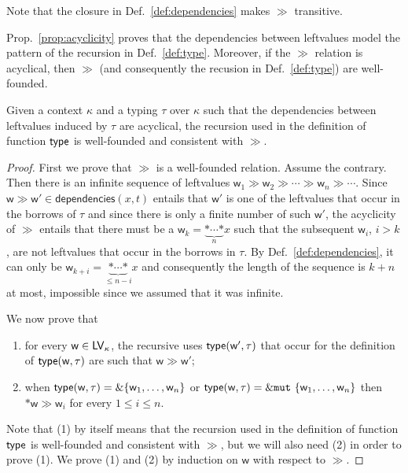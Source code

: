 \noindent
Note that the closure in Def.~\ref{def:dependencies} makes $\gg$ transitive.

Prop.~\ref{prop:acyclicity} proves that the dependencies between leftvalues
model the pattern of the recursion in Def.~\ref{def:type}. Moreover,
if the $\gg$ relation is acyclical, then $\gg$ (and consequently the recusion
in Def.~\ref{def:type}) are well-founded.

\begin{proposition}\label{prop:acyclicity}
  Given a context $\kappa$ and a typing $\tau$ over $\kappa$
  such that the dependencies between leftvalues induced by $\tau$ are acyclical,
  the recursion used in the definition of function $\mathsf{type}$ is well-founded and consistent with $\gg$.
\end{proposition}
\begin{proof}
  First we prove that $\gg$ is a well-founded relation. Assume the contrary. Then
  there is an infinite sequence of leftvalues
  $\mathsf{w}_1\gg\mathsf{w}_2\gg\cdots\gg\mathsf{w}_n\gg\cdots$.
  Since $\mathsf{w}\gg\mathsf{w}'\in\mathsf{dependencies}(x,t)$ entails that
  $\mathsf{w}'$ is one of the leftvalues that occur in the borrows of $\tau$ and
  since there is only a finite number of such $\mathsf{w}'$, the acyclicity of $\gg$ entails that
  there must be a $\mathsf{w}_k=\underbrace{\mathtt{*}\cdots\mathtt{*}}_{\text{$n$}}x$
  such that the subsequent $\mathsf{w}_i$, $i>k$,
  are not leftvalues that occur in the borrows in $\tau$. By Def.~\ref{def:dependencies},
  it can only be $\mathsf{w}_{k+i}=\underbrace{\mathtt{*}\cdots\mathtt{*}}_{\text{$\le n-i$}}x$
  and consequently the length of the sequence is $k+n$ at most, impossible since we assumed that
  it was infinite.

  We now prove that
  \begin{enumerate}
  \item for every $\mathsf{w}\in\mathsf{LV}_\kappa$, the
    recursive uses $\mathsf{type}(\mathsf{w}',\tau)$ that occur for the definition
    of $\mathsf{type}(\mathsf{w},\tau)$ are such that $\mathsf{w}\gg\mathsf{w}'$;
  \item when $\mathsf{type}(\mathsf{w},\tau)=\&\{\mathsf{w}_1,\ldots,\mathsf{w}_n\}$
    or $\mathsf{type}(\mathsf{w},\tau)=\&\mathtt{mut}\ \{\mathsf{w}_1,\ldots,\mathsf{w}_n\}$
    then $\mathtt{*}\mathsf{w}\gg\mathsf{w}_i$ for every $1\le i\le n$.
  \end{enumerate}
  Note that (1) by itself means that
  the recursion used in the
  definition of function $\mathsf{type}$ is well-founded and consistent with $\gg$, but we will also
  need (2) in order to prove (1).
  We prove (1) and (2) by induction on $\mathsf{w}$ with respect to $\gg$.


\end{proof}
